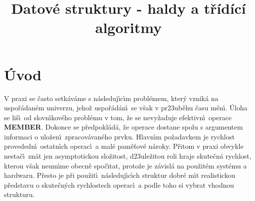\documentclass[a4paper,12pt]{article}
\begin{document}
     

\newtheorem*{dusledek}{Důsledek}
\newtheorem*{lemma}{Lemma}
\newtheorem*{veta}{Věta}
\newtheorem*{tvrzeni}{Tvrzení}

\def \emph#1{\underbar{#1}}
\def \Prob{\operatorname{Prob}}
\def \var{\operatorname{var}}

\title{Datové struktury - haldy a třídící algoritmy}
\date{}
\maketitle


\section{Úvod}

\flushpar V praxi se \v casto setk\'av\'ame s n\'asleduj\'\i c\'\i m 
probl\'emem, kter\'y vznik\'a na uspo\v r\'adan\'em univerzu, jeho\v z 
uspo\v r\'ad\'an\'\i\ se v\v sak v pr\accent23ub\v ehu \v casu m\v en\'\i . \'Uloha se 
li\v s\'\i\ od slovn\'\i kov\'eho probl\'emu v tom, \v ze se nevy\v zaduje  
efektivn\'\i\ operace {\bf MEMBER}. Dokonce se p\v redpokl\'ad\'a, \v ze ope\-race 
dostane spolu s argumentem informaci o ulo\v zen\'\i\ 
zpracov\'avan\'eho prvku. 
Hlav\-n\'\i m po\v zadavkem je rychlost provededn\'\i\ ostatn\'\i ch operac\'\i\ a mal\'e 
pam\v e\v tov\'e n\'aroky. P\v ritom v praxi obvykle nesta\v c\'\i\ zn\'at jen 
asymptotickou slo\v zitost, d\accent23ule\v zitou roli hraje skute\v cn\'a 
rychlost, kterou v\v sak neum\'\i me obecn\v e spo\v c\'\i tat, proto\v ze je z\'avisl\'a na 
pou\v zit\'em syst\'emu a hardwaru. P\v resto je p\v ri pou\v zit\'\i\ 
n\'asleduj\'\i c\'\i ch struktur dobr\'e m\'\i t realistickou p\v redstavu o 
skute\v cn\'ych rychlostech operac\'\i\ a podle toho si vybrat 
vhodnou strukturu. 
\medskip
\end{document}
